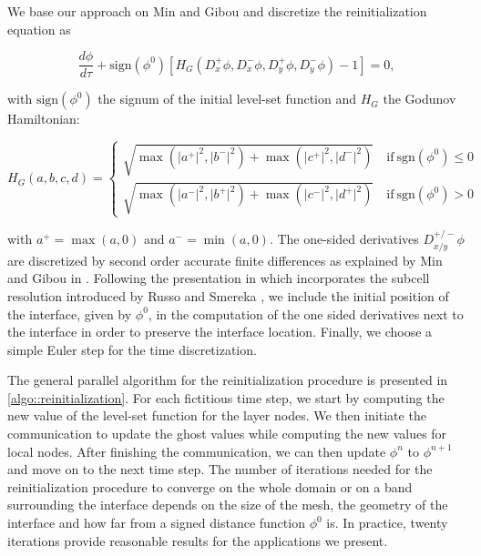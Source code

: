 We base our approach on Min and Gibou \cite{Min_Gibou:2007:Level_Set_Adaptive} and discretize the reinitialization equation as

\begin{equation*}
\frac{d\phi}{d\tau} + \mathrm{sign}(\phi^0)[H_G(D^+_x\phi, D^-_x\phi, D^+_y\phi, D^-_y\phi)-1] = 0,
\end{equation*}

with $\mathrm{sign}(\phi^0)$ the signum of the initial level-set function and $H_G$ the Godunov Hamiltonian:

\begin{equation*}
H_G(a,b,c,d) =
\begin{cases}
\sqrt{\max(\lvert a^+ \rvert^2, \lvert b^- \rvert^2) + \max(\lvert c^+ \rvert^2, \lvert d^- \rvert^2)} \quad \mathrm{if~sgn}(\phi^0) \leq 0\\
\sqrt{\max(\lvert a^- \rvert^2, \lvert b^+ \rvert^2) + \max(\lvert c^- \rvert^2, \lvert d^+ \rvert^2)} \quad \mathrm{if~sgn}(\phi^0) > 0
\end{cases}
\end{equation*}

with $a^+=\max(a,0)$ and $a^-=\min(a,0)$. The one-sided derivatives $D^{+/-}_{x/y}\phi$ are discretized by second order accurate finite differences as explained by Min and Gibou in \cite{Min_Gibou:2007:Level_Set_Adaptive}. Following the presentation in \cite{Min_Gibou:2007:Level_Set_Adaptive} which incorporates the subcell resolution introduced by Russo and Smereka \cite{Russo_Smereka}, we include the initial position of the interface, given by $\phi^0$, in the computation of the one sided derivatives next to the interface in order to preserve the interface location. Finally, we choose a simple Euler step for the time discretization.

The general parallel algorithm for the reinitialization procedure is presented in \ref{algo::reinitialization}. For each fictitious time step, we start by computing the new value of the level-set function for the layer nodes. We then initiate the communication to update the ghost values while computing the new values for local nodes. After finishing the communication, we can then update $\phi^n$ to $\phi^{n+1}$ and move on to the next time step. The number of iterations needed for the reinitialization procedure to converge on the whole domain or on a band surrounding the interface depends on the size of the mesh, the geometry of the interface and how far from a signed distance function $\phi^0$ is. In practice, twenty iterations provide reasonable results for the applications we present.

